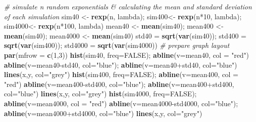 \documentclass[]{article}
\newenvironment{Shaded}{\begin{snugshade}}{\end{snugshade}}
\newcommand{\KeywordTok}[1]{\textcolor[rgb]{0.13,0.29,0.53}{\textbf{{#1}}}}
\newcommand{\DataTypeTok}[1]{\textcolor[rgb]{0.13,0.29,0.53}{{#1}}}
\newcommand{\DecValTok}[1]{\textcolor[rgb]{0.00,0.00,0.81}{{#1}}}
\newcommand{\StringTok}[1]{\textcolor[rgb]{0.31,0.60,0.02}{{#1}}}
\newcommand{\CommentTok}[1]{\textcolor[rgb]{0.56,0.35,0.01}{\textit{{#1}}}}
\newcommand{\OtherTok}[1]{\textcolor[rgb]{0.56,0.35,0.01}{{#1}}}
\newcommand{\NormalTok}[1]{{#1}}
\begin{document}
\begin{Shaded}
\begin{Highlighting}[]
\CommentTok{# simulate n random exponentials & calculating the mean and standard deviation of each simulation}
\NormalTok{sim40 <-}\StringTok{ }\KeywordTok{rexp}\NormalTok{(n, lambda); sim400<-}\StringTok{ }\KeywordTok{rexp}\NormalTok{(n*}\DecValTok{10}\NormalTok{, lambda); sim4000<-}\StringTok{ }\KeywordTok{rexp}\NormalTok{(n*}\DecValTok{100}\NormalTok{, lambda)}
\NormalTok{mean40 <-}\StringTok{ }\KeywordTok{mean}\NormalTok{(sim40); mean400 <-}\StringTok{ }\KeywordTok{mean}\NormalTok{(sim40); mean4000 <-}\StringTok{ }\KeywordTok{mean}\NormalTok{(sim40)}
\NormalTok{std40 =}\StringTok{ }\KeywordTok{sqrt}\NormalTok{(}\KeywordTok{var}\NormalTok{(sim40)); std400 =}\StringTok{ }\KeywordTok{sqrt}\NormalTok{(}\KeywordTok{var}\NormalTok{(sim400)); std4000 =}\StringTok{ }\KeywordTok{sqrt}\NormalTok{(}\KeywordTok{var}\NormalTok{(sim4000))}
\CommentTok{# prepare graph layout}
\KeywordTok{par}\NormalTok{(}\DataTypeTok{mfrow =} \KeywordTok{c}\NormalTok{(}\DecValTok{1}\NormalTok{,}\DecValTok{3}\NormalTok{))}
\KeywordTok{hist}\NormalTok{(sim40, }\DataTypeTok{freq=}\OtherTok{FALSE}\NormalTok{); }\KeywordTok{abline}\NormalTok{(}\DataTypeTok{v=}\NormalTok{mean40, }\DataTypeTok{col =} \StringTok{"red"}\NormalTok{)}
\KeywordTok{abline}\NormalTok{(}\DataTypeTok{v=}\NormalTok{mean40-std40, }\DataTypeTok{col=}\StringTok{"blue"}\NormalTok{); }\KeywordTok{abline}\NormalTok{(}\DataTypeTok{v=}\NormalTok{mean40+std40, }\DataTypeTok{col=}\StringTok{"blue"}\NormalTok{)}
\KeywordTok{lines}\NormalTok{(x,y, }\DataTypeTok{col=}\StringTok{"grey"}\NormalTok{)  }
\KeywordTok{hist}\NormalTok{(sim400, }\DataTypeTok{freq=}\OtherTok{FALSE}\NormalTok{); }\KeywordTok{abline}\NormalTok{(}\DataTypeTok{v=}\NormalTok{mean400, }\DataTypeTok{col =} \StringTok{"red"}\NormalTok{)}
\KeywordTok{abline}\NormalTok{(}\DataTypeTok{v=}\NormalTok{mean400-std400, }\DataTypeTok{col=}\StringTok{"blue"}\NormalTok{); }\KeywordTok{abline}\NormalTok{(}\DataTypeTok{v=}\NormalTok{mean400+std400, }\DataTypeTok{col=}\StringTok{"blue"}\NormalTok{)}
\KeywordTok{lines}\NormalTok{(x,y, }\DataTypeTok{col=}\StringTok{"grey"}\NormalTok{) }
\KeywordTok{hist}\NormalTok{(sim4000, }\DataTypeTok{freq=}\OtherTok{FALSE}\NormalTok{); }\KeywordTok{abline}\NormalTok{(}\DataTypeTok{v=}\NormalTok{mean4000, }\DataTypeTok{col =} \StringTok{"red"}\NormalTok{)}
\KeywordTok{abline}\NormalTok{(}\DataTypeTok{v=}\NormalTok{mean4000-std4000, }\DataTypeTok{col=}\StringTok{"blue"}\NormalTok{); }\KeywordTok{abline}\NormalTok{(}\DataTypeTok{v=}\NormalTok{mean4000+std4000, }\DataTypeTok{col=}\StringTok{"blue"}\NormalTok{)}
\KeywordTok{lines}\NormalTok{(x,y, }\DataTypeTok{col=}\StringTok{"grey"}\NormalTok{)}
\end{Highlighting}
\end{Shaded}
\end{document}
